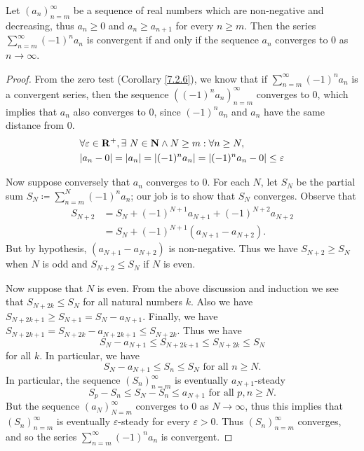 \begin{proposition}\label{7.2.12}
    Let \((a_n)_{n = m}^\infty\) be a sequence of real numbers which are non-negative and decreasing, thus \(a_n \geq 0\) and \(a_n \geq a_{n + 1}\) for every \(n \geq m\).
    Then the series \(\sum_{n = m}^\infty (-1)^n a_n\) is convergent if and only if the sequence \(a_n\) converges to \(0\) as \(n \to \infty\).
\end{proposition}

\begin{proof}
    From the zero test (Corollary \ref{7.2.6}), we know that if \(\sum_{n = m}^\infty (-1)^n a_n\) is a convergent series, then the sequence \(((-1)^n a_n)_{n = m}^\infty\) converges to \(0\), which implies that \(a_n\) also converges to \(0\), since \((-1)^n a_n\) and \(a_n\) have the same distance from \(0\).
    \begin{align*}
         & \forall \varepsilon \in \mathbf{R}^+, \exists\ N \in \mathbf{N} \land N \geq m : \forall n \geq N, \\
         & \abs*{a_n - 0} = \abs*{a_n} = \abs*{(-1)^n a_n} = \abs*{(-1)^n a_n - 0} \leq \varepsilon
    \end{align*}

    Now suppose conversely that \(a_n\) converges to \(0\).
    For each \(N\), let \(S_N\) be the partial sum \(S_N \coloneqq \sum_{n = m}^N (-1)^n a_n\);
    our job is to show that \(S_N\) converges.
    Observe that
    \begin{align*}
        S_{N + 2} & = S_N + (-1)^{N + 1} a_{N + 1} + (-1)^{N + 2} a_{N + 2} \\
                  & = S_N + (-1)^{N + 1} (a_{N + 1} - a_{N + 2}).
    \end{align*}
    But by hypothesis, \((a_{N + 1} - a_{N + 2})\) is non-negative.
    Thus we have \(S_{N + 2} \geq S_N\) when \(N\) is odd and \(S_{N + 2} \leq S_N\) if \(N\) is even.

    Now suppose that \(N\) is even.
    From the above discussion and induction we see that \(S_{N + 2k} \leq S_N\) for all natural numbers \(k\).
    Also we have \(S_{N + 2k + 1} \geq S_{N + 1} = S_N - a_{N + 1}\).
    Finally, we have \(S_{N + 2k + 1} = S_{N + 2k} - a_{N + 2k + 1} \leq S_{N + 2k}\).
    Thus we have
    \[
        S_N - a_{N + 1} \leq S_{N + 2k + 1} \leq S_{N + 2k} \leq S_N
    \]
    for all \(k\).
    In particular, we have
    \[
        S_N - a_{N + 1} \leq S_n \leq S_N \text{ for all } n \geq N.
    \]
    In particular, the sequence \((S_n)_{n = m}^\infty\) is eventually \(a_{N + 1}\)-steady
    \[
        S_p - S_n \leq S_N - S_n \leq a_{N + 1} \text{ for all } p, n \geq N.
    \]
    But the sequence \((a_N)_{N = m}^\infty\) converges to \(0\) as \(N \to \infty\), thus this implies that \((S_n)_{n = m}^\infty\) is eventually \(\varepsilon\)-steady for every \(\varepsilon > 0\).
    Thus \((S_n)_{n = m}^\infty\) converges, and so the series \(\sum_{n = m}^\infty (-1)^n a_n\) is convergent.
\end{proof}

